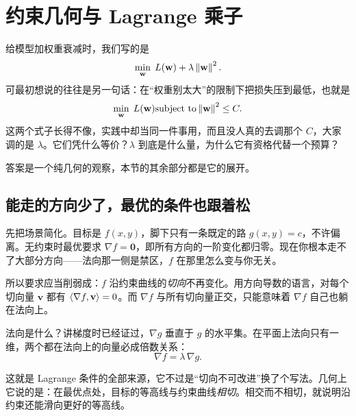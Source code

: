\section{约束几何与 Lagrange 乘子}
\label{sec:02-Calculus/06-Multivariable-Calculus/06}

给模型加权重衰减时，我们写的是
\[
\min_{\mathbf w}\;L(\mathbf w)+\lambda\left\lVert\mathbf w\right\rVert^2 .
\]
可最初想说的往往是另一句话：在``权重别太大''的限制下把损失压到最低，也就是
\[
\min_{\mathbf w}\;L(\mathbf w)
\space\text{subject to}\space
\left\lVert\mathbf w\right\rVert^2\le C .
\]
这两个式子长得不像，实践中却当同一件事用，而且没人真的去调那个 \(C\)，大家调的是 \(\lambda\)。它们凭什么等价？\(\lambda\) 到底是什么量，为什么它有资格代替一个预算？

答案是一个纯几何的观察，本节的其余部分都是它的展开。

\subsection{能走的方向少了，最优的条件也跟着松}

先把场景简化。目标是 \(f(x,y)\)，脚下只有一条既定的路 \(g(x,y)=c\)，不许偏离。无约束时最优要求 \(\nabla f=\mathbf 0\)，即所有方向的一阶变化都归零。现在你根本走不了大部分方向——法向那一侧是禁区，\(f\) 在那里怎么变与你无关。

所以要求应当削弱成：\(f\) 沿约束曲线的\emph{切向}不再变化。用方向导数的语言，对每个切向量 \(\mathbf v\) 都有 \(\left\langle\nabla f,\mathbf v\right\rangle=0\)。而 \(\nabla f\) 与所有切向量正交，只能意味着 \(\nabla f\) 自己也躺在法向上。

法向是什么？讲梯度时已经证过，\(\nabla g\) 垂直于 \(g\) 的水平集。在平面上法向只有一维，两个都在法向上的向量必成倍数关系：
\[
\nabla f=\lambda\,\nabla g .
\]

这就是 Lagrange 条件的全部来源，它不过是``切向不可改进''换了个写法。几何上它说的是：在最优点处，目标的等高线与约束曲线\emph{相切}。相交而不相切，就说明沿约束还能滑向更好的等高线。

